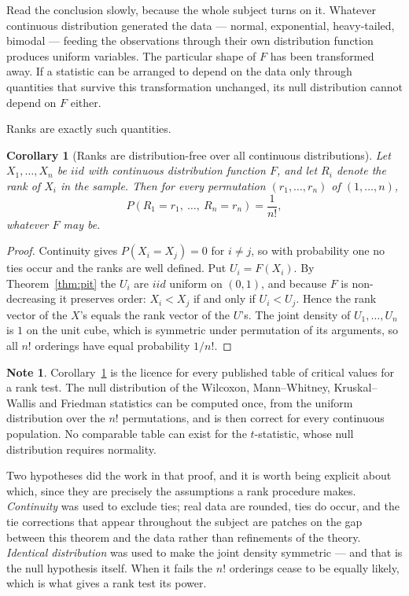 \documentclass[12pt,a4paper]{report}
\theoremstyle{definition}
\newtheorem{note}[thm]{Note}
\theoremstyle{plain}
\newtheorem{coro}[thm]{Corollary}
\begin{document}
Read the conclusion slowly, because the whole subject turns on it. Whatever
continuous distribution generated the data --- normal, exponential, heavy-tailed,
bimodal --- feeding the observations through their own distribution function
produces uniform variables. The particular shape of $F$ has been transformed
away. If a statistic can be arranged to depend on the data only through
quantities that survive this transformation unchanged, its null distribution
cannot depend on $F$ either.

Ranks are exactly such quantities.

\begin{coro}[Ranks are distribution-free over all continuous distributions]
\label{coro:ranks}
Let $X_1,\dots,X_n$ be $iid$ with continuous distribution function $F$, and let
$R_i$ denote the rank of $X_i$ in the sample. Then for every permutation
$(r_1,\dots,r_n)$ of $(1,\dots,n)$,
$$P\left(R_1 = r_1,\ \dots,\ R_n = r_n\right) = \frac{1}{n!} ,$$
whatever $F$ may be.
\end{coro}

\begin{proof}
Continuity gives $P(X_i = X_j)=0$ for $i\neq j$, so with probability one no
ties occur and the ranks are well defined. Put $U_i = F(X_i)$. By
Theorem~\ref{thm:pit} the $U_i$ are $iid$ uniform on $(0,1)$, and because $F$
is non-decreasing it preserves order: $X_i<X_j$ if and only if $U_i<U_j$.
Hence the rank vector of the $X$'s equals the rank vector of the $U$'s. The
joint density of $U_1,\dots,U_n$ is $1$ on the unit cube, which is symmetric
under permutation of its arguments, so all $n!$ orderings have equal
probability $1/n!$.
\end{proof}

\begin{note}
Corollary~\ref{coro:ranks} is the licence for every published table of critical
values for a rank test. The null distribution of the Wilcoxon, Mann--Whitney,
Kruskal--Wallis and Friedman statistics can be computed once, from the uniform
distribution over the $n!$ permutations, and is then correct for every
continuous population. No comparable table can exist for the $t$-statistic,
whose null distribution requires normality.
\end{note}

Two hypotheses did the work in that proof, and it is worth being explicit about
which, since they are precisely the assumptions a rank procedure makes.
\emph{Continuity} was used to exclude ties; real data are rounded, ties do
occur, and the tie corrections that appear throughout the subject are patches on
the gap between this theorem and the data rather than refinements of the theory.
\emph{Identical distribution} was used to make the joint density symmetric ---
and that is the null hypothesis itself. When it fails the $n!$ orderings cease
to be equally likely, which is what gives a rank test its power.
\end{document}
